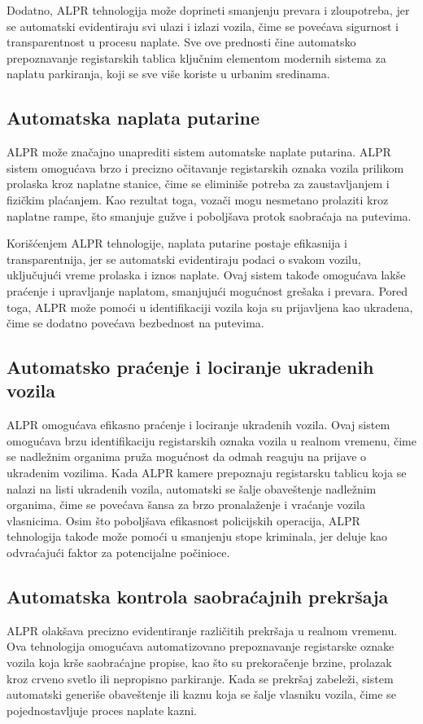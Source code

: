 \documentclass[a4paper,12pt]{article}
\begin{document}
	Dodatno, ALPR tehnologija može doprineti smanjenju prevara i zloupotreba, jer se automatski evidentiraju svi ulazi i izlazi vozila, čime se povećava sigurnost i transparentnost u procesu naplate. Sve ove prednosti čine automatsko prepoznavanje registarskih tablica ključnim elementom modernih sistema za naplatu parkiranja, koji se sve više koriste u urbanim sredinama.
	
	\subsection{Automatska naplata putarine}
	ALPR može značajno unaprediti sistem automatske naplate putarina. ALPR sistem omogućava brzo i precizno očitavanje registarskih oznaka vozila prilikom prolaska kroz naplatne stanice, čime se eliminiše potreba za zaustavljanjem i fizičkim plaćanjem. Kao rezultat toga, vozači mogu nesmetano prolaziti kroz naplatne rampe, što smanjuje gužve i poboljšava protok saobraćaja na putevima.
	
	Korišćenjem ALPR tehnologije, naplata putarine postaje efikasnija i transparentnija, jer se automatski evidentiraju podaci o svakom vozilu, uključujući vreme prolaska i iznos naplate. Ovaj sistem takođe omogućava lakše praćenje i upravljanje naplatom, smanjujući mogućnost grešaka i prevara. Pored toga, ALPR može pomoći u identifikaciji vozila koja su prijavljena kao ukradena, čime se dodatno povećava bezbednost na putevima.
	
	\subsection{Automatsko praćenje i lociranje ukradenih vozila}
	ALPR omogućava efikasno praćenje i lociranje ukradenih vozila. Ovaj sistem omogućava brzu identifikaciju registarskih oznaka vozila u realnom vremenu, čime se nadležnim organima pruža mogućnost da odmah reaguju na prijave o ukradenim vozilima. Kada ALPR kamere prepoznaju registarsku tablicu koja se nalazi na listi ukradenih vozila, automatski se šalje obaveštenje nadležnim organima, čime se povećava šansa za brzo pronalaženje i vraćanje vozila vlasnicima. Osim što poboljšava efikasnost policijskih operacija, ALPR tehnologija takođe može pomoći u smanjenju stope kriminala, jer deluje kao odvraćajući faktor za potencijalne počinioce.
	
	\subsection{Automatska kontrola saobraćajnih prekršaja}
	ALPR olakšava precizno evidentiranje različitih prekršaja u realnom vremenu. Ova tehnologija omogućava automatizovano prepoznavanje registarske oznake vozila koja krše saobraćajne propise, kao što su prekoračenje brzine, prolazak kroz crveno svetlo ili nepropisno parkiranje. Kada se prekršaj zabeleži, sistem automatski generiše obaveštenje ili kaznu koja se šalje vlasniku vozila, čime se pojednostavljuje proces naplate kazni.
	
\end{document}
